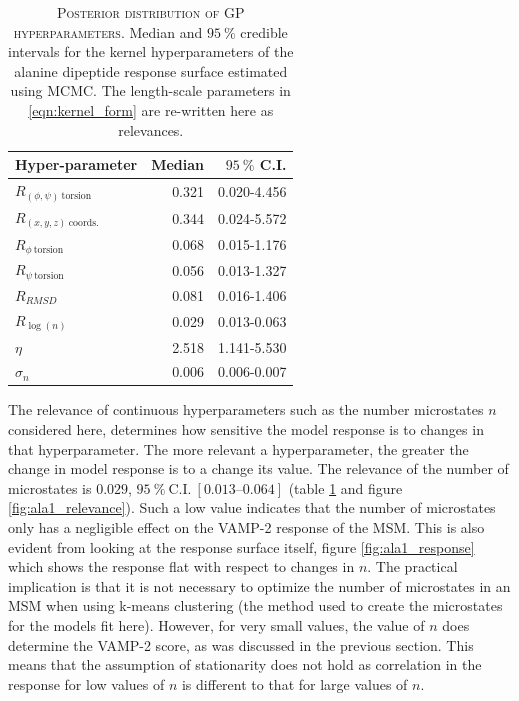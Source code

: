\begin{table}
    \centering
    \begin{tabular}{lrr}
    \toprule
                          Hyper-parameter &    Median & $\SI{95}{\percent}$ C.I. \\
    \midrule
     $R_{(\phi, \psi)\ \mathrm{torsion}}$ &  0.321 & 0.020-4.456 \\
        $R_{(x, y, z)\ \mathrm{coords.}}$ &  0.344 & 0.024-5.572 \\
             $R_{\phi\ \mathrm{torsion}}$ &  0.068 & 0.015-1.176 \\
             $R_{\psi\ \mathrm{torsion}}$ &  0.056 & 0.013-1.327 \\
                               $R_{RMSD}$ &  0.081 & 0.016-1.406 \\
                          $R_{\log{(n)}}$ &  0.029 & 0.013-0.063 \\
                                   $\eta$ &  2.518 & 1.141-5.530 \\
                               $\sigma_n$ &  0.006 & 0.006-0.007 \\
    \bottomrule
    \end{tabular}
    \caption[Posterior distribution of GP hyperparameters]{\textsc{Posterior distribution of GP hyperparameters}. Median and $\SI{95}{\percent}$ credible intervals for the kernel hyperparameters of the alanine dipeptide response surface estimated using MCMC. The length-scale parameters in \ref{eqn:kernel_form} are re-written here as relevances.}
    \label{tab:ala1_rel_post}
\end{table}

The relevance of continuous hyperparameters such as the number microstates $n$ considered here,  determines how sensitive the model response is to changes in that hyperparameter. The more relevant a hyperparameter, the  greater the change in model response is to a change its value.  The  relevance of the number of microstates is $0.029$, $\SI{95}{\percent}\ \mathrm{C.I.}\ [\numrange[range-phrase=\text{--}]{0.013}{0.064}]$ (table \ref{tab:ala1_rel_post} and figure \ref{fig:ala1_relevance}). Such a low value indicates that the number of microstates only has a negligible effect on the VAMP-2 response of the MSM. This is also evident from looking at the response surface itself, figure  \ref{fig:ala1_response} which shows the response flat with respect to changes in $n$. The practical implication is that it is not necessary to optimize the number of microstates in an MSM when using k-means clustering (the method used to create the microstates for the models fit here). However, for very small values, the value of $n$ does determine the VAMP-2 score, as was discussed in the previous section. This means that the assumption of stationarity does not hold as correlation in the response for low values of $n$ is different to that for large values of $n$. 

